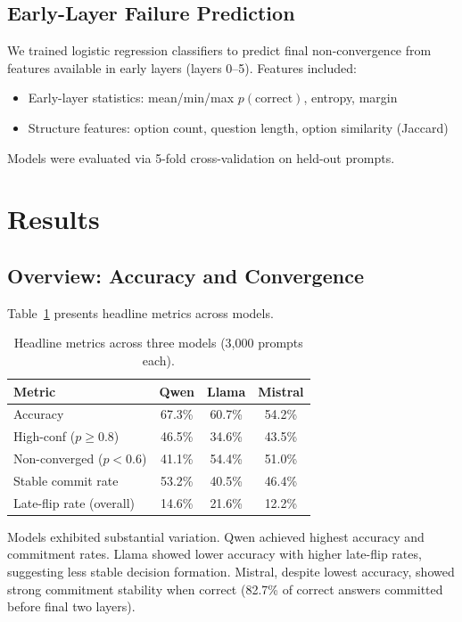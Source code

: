 \documentclass[11pt]{article}
\theoremstyle{definition}
\begin{document}
\subsection{Early-Layer Failure Prediction}

We trained logistic regression classifiers to predict final non-convergence from features available in early layers (layers 0--5). Features included:

\begin{itemize}
    \item Early-layer statistics: mean/min/max $p(\text{correct})$, entropy, margin
    \item Structure features: option count, question length, option similarity (Jaccard)
\end{itemize}

Models were evaluated via 5-fold cross-validation on held-out prompts.

\section{Results}

\subsection{Overview: Accuracy and Convergence}

Table~\ref{tab:headline} presents headline metrics across models.

\begin{table}[ht]
\centering
\caption{Headline metrics across three models (3,000 prompts each).}
\label{tab:headline}
\begin{tabular}{lccc}
\toprule
\textbf{Metric} & \textbf{Qwen} & \textbf{Llama} & \textbf{Mistral} \\
\midrule
Accuracy & 67.3\% & 60.7\% & 54.2\% \\
High-conf ($p \geq 0.8$) & 46.5\% & 34.6\% & 43.5\% \\
Non-converged ($p < 0.6$) & 41.1\% & 54.4\% & 51.0\% \\
Stable commit rate & 53.2\% & 40.5\% & 46.4\% \\
Late-flip rate (overall) & 14.6\% & 21.6\% & 12.2\% \\
\bottomrule
\end{tabular}
\end{table}

Models exhibited substantial variation. Qwen achieved highest accuracy and commitment rates. Llama showed lower accuracy with higher late-flip rates, suggesting less stable decision formation. Mistral, despite lowest accuracy, showed strong commitment stability when correct (82.7\% of correct answers committed before final two layers).
\end{document}
